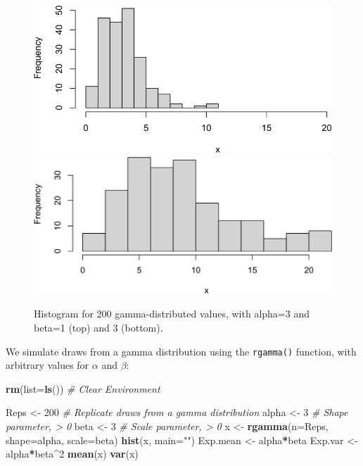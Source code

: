 \documentclass[
]{krantz}
\makeatletter
\newenvironment{Shaded}{\begin{snugshade}}{\end{snugshade}}
\newcommand{\AttributeTok}[1]{\textcolor[rgb]{0.27,0.27,0.27}{#1}}
\newcommand{\CommentTok}[1]{\textcolor[rgb]{0.37,0.37,0.37}{\textit{#1}}}
\newcommand{\DecValTok}[1]{\textcolor[rgb]{0.06,0.06,0.06}{#1}}
\newcommand{\FunctionTok}[1]{\textcolor[rgb]{0.27,0.27,0.27}{\textbf{#1}}}
\newcommand{\NormalTok}[1]{#1}
\newcommand{\OtherTok}[1]{\textcolor[rgb]{0.37,0.37,0.37}{#1}}
\newcommand{\SpecialCharTok}[1]{\textcolor[rgb]{0.43,0.43,0.43}{\textbf{#1}}}
\newcommand{\StringTok}[1]{\textcolor[rgb]{0.5,0.5,0.5}{#1}}
\newenvironment{kframe}{%
\medskip{}
\setlength{\fboxsep}{.8em}
 \def\at@end@of@kframe{}%
 \ifinner\ifhmode%
  \def\at@end@of@kframe{\end{minipage}}%
  \begin{minipage}{\columnwidth}%
 \fi\fi%
 \def\FrameCommand##1{\hskip\@totalleftmargin \hskip-\fboxsep
 \colorbox{shadecolor}{##1}\hskip-\fboxsep
     \hskip-\linewidth \hskip-\@totalleftmargin \hskip\columnwidth}%
 \MakeFramed {\advance\hsize-\width
   \@totalleftmargin\z@ \linewidth\hsize
   \@setminipage}}%
 {\par\unskip\endMakeFramed%
 \at@end@of@kframe}
\renewenvironment{Shaded}{\begin{kframe}}{\end{kframe}}
\makeatother
\begin{document}
\begin{figure}
\includegraphics[width=0.9\linewidth]{bookdown_files/figure-latex/Gamma-1} \includegraphics[width=0.9\linewidth]{bookdown_files/figure-latex/Gamma-2} \caption{Histogram for 200 gamma-distributed values, with alpha=3 and beta=1  (top) and 3 (bottom).}\label{fig:Gamma}
\end{figure}

We simulate draws from a gamma distribution using the \texttt{rgamma()} function, with arbitrary values for \(\alpha\) and \(\beta\):

\begin{Shaded}
\begin{Highlighting}[]
\FunctionTok{rm}\NormalTok{(}\AttributeTok{list=}\FunctionTok{ls}\NormalTok{()) }\CommentTok{\# Clear Environment}

\NormalTok{Reps }\OtherTok{\textless{}{-}} \DecValTok{200} \CommentTok{\# Replicate draws from a gamma distribution}
\NormalTok{alpha }\OtherTok{\textless{}{-}} \DecValTok{3} \CommentTok{\# Shape parameter, \textgreater{} 0}
\NormalTok{beta }\OtherTok{\textless{}{-}} \DecValTok{3} \CommentTok{\# Scale parameter, \textgreater{} 0}
\NormalTok{x }\OtherTok{\textless{}{-}} \FunctionTok{rgamma}\NormalTok{(}\AttributeTok{n=}\NormalTok{Reps, }\AttributeTok{shape=}\NormalTok{alpha, }\AttributeTok{scale=}\NormalTok{beta)}
\FunctionTok{hist}\NormalTok{(x, }\AttributeTok{main=}\StringTok{""}\NormalTok{)}
\NormalTok{Exp.mean }\OtherTok{\textless{}{-}}\NormalTok{ alpha}\SpecialCharTok{*}\NormalTok{beta}
\NormalTok{Exp.var }\OtherTok{\textless{}{-}}\NormalTok{ alpha}\SpecialCharTok{*}\NormalTok{beta}\SpecialCharTok{\^{}}\DecValTok{2}
\FunctionTok{mean}\NormalTok{(x)}
\FunctionTok{var}\NormalTok{(x)}
\end{Highlighting}
\end{Shaded}
\end{document}
